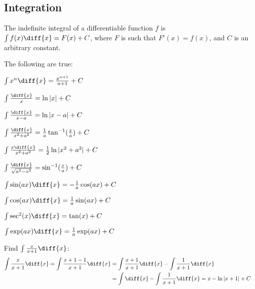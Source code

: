\documentclass[crop=false,class=article,oneside]{standalone}
\begin{document}
    \subsection{Integration}
        \begin{definition}
            The indefinite integral of a differentiable function
            $f$ is $\int{f(x)}\diff{x}=F(x)+C$, where $F$ is such
            that $F'(x)=f(x)$, and $C$ is an arbitrary constant.
        \end{definition}
        \begin{theorem}
            The following are true:
            \begin{enumerate}
                \begin{multicols}{2}
                    \item $\int{x^{n}}\diff{x}%
                           =\frac{x^{n+1}}{n+1}+C$
                    \item $\int\frac{\diff{x}}{x}=\ln|x|+C$
                    \item $\int\frac{\diff{x}}{x-a}=\ln|x-a|+C$
                    \item $\int\frac{\diff{x}}{x^{2}+a^{2}}%
                           =\frac{1}{a}\tan^{-1}(\frac{x}{a})+C$
                    \item $\int\frac{x\diff{x}}{x^{2}+a^{2}}%
                           =\frac{1}{2}\ln|x^{2}+a^{2}|+C$
                    \item $\int\frac{\diff{x}}{\sqrt{a^{2}-x^{2}}}%
                           =\sin^{-1}(\frac{x}{a})+C$
                    \item $\int\sin(ax)\diff{x}=-\frac{1}{a}\cos(ax)+C$
                    \item $\int\cos(ax)\diff{x}=\frac{1}{a}\sin(ax)+C$
                    \item $\int\sec^{2}(x)\diff{x}=\tan(x)+C$
                    \item $\int\exp(ax)\diff{x}=\frac{1}{a}\exp(ax)+C$
                \end{multicols}
            \end{enumerate}
        \end{theorem}
        \begin{example}
            Find $\int\frac{x}{x+1}\diff{x}$:
            \begin{align*}
                \int\frac{x}{x+1}\diff{x}
                =\int\frac{x+1-1}{x+1}\diff{x}
                &=\int\frac{x+1}{x+1}\diff{x}
                -\int\frac{1}{x+1}\diff{x}\\
                &=\int\diff{x}-\int\frac{1}{x+1}\diff{x}
                =x-\ln|x+1|+C
            \end{align*}
        \end{example}
\end{document}
